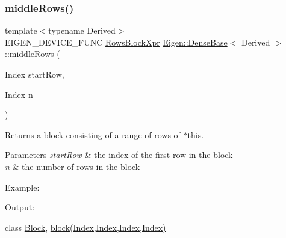\subsubsection{\texorpdfstring{middleRows()}{middleRows()}\hspace{0.1cm}{\footnotesize\ttfamily [1/2]}}
{\footnotesize\ttfamily template$<$typename Derived$>$ \\
E\+I\+G\+E\+N\+\_\+\+D\+E\+V\+I\+C\+E\+\_\+\+F\+U\+NC \mbox{\hyperlink{class_eigen_1_1_block}{Rows\+Block\+Xpr}} \mbox{\hyperlink{class_eigen_1_1_dense_base}{Eigen\+::\+Dense\+Base}}$<$ Derived $>$\+::middle\+Rows (\begin{DoxyParamCaption}\item[{Index}]{start\+Row,  }\item[{Index}]{n }\end{DoxyParamCaption})\hspace{0.3cm}{\ttfamily [inline]}}

\begin{DoxyReturn}{Returns}
a block consisting of a range of rows of $\ast$this.
\end{DoxyReturn}

\begin{DoxyParams}{Parameters}
{\em start\+Row} & the index of the first row in the block \\
\hline
{\em n} & the number of rows in the block\\
\hline
\end{DoxyParams}
Example\+: 
\begin{DoxyCodeInclude}{0}
\end{DoxyCodeInclude}
 Output\+: 
\begin{DoxyVerbInclude}
\end{DoxyVerbInclude}
 class \mbox{\hyperlink{class_eigen_1_1_block}{Block}}, \mbox{\hyperlink{class_eigen_1_1_dense_base_ab8e42e67c5cfd5fa13e684642f0f65bf}{block(\+Index,\+Index,\+Index,\+Index)}} \mbox{\label{class_eigen_1_1_dense_base_abfa7020bf152e0a39e2a124080c4d59c}} 
